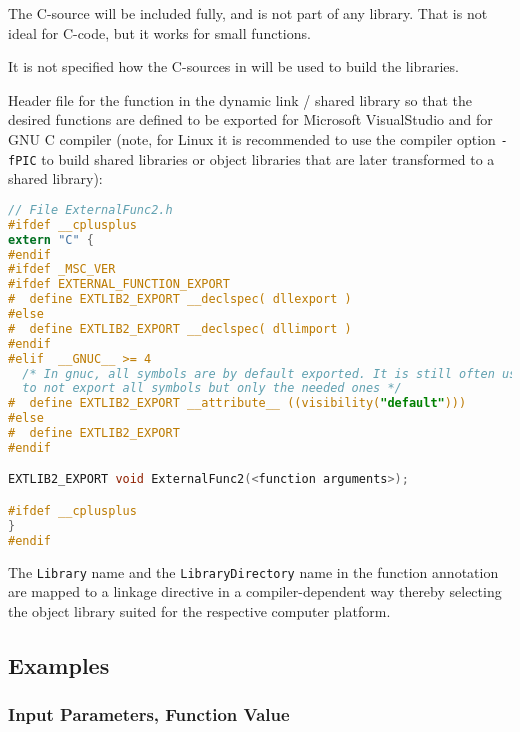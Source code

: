 \begin{example}
The C-source  will be included fully, and is not part of any library.
That is not ideal for C-code, but it works for small functions.

It is not specified how the C-sources in  will be used to build the libraries.

Header file for the function in the dynamic link / shared library
 so that the desired functions are defined to be exported
for Microsoft VisualStudio and for GNU C compiler (note, for Linux it is
recommended to use the compiler option \lstinline!-fPIC! to build shared
libraries or object libraries that are later transformed to a shared
library):
\begin{lstlisting}[language=C]
// File ExternalFunc2.h
#ifdef __cplusplus
extern "C" {
#endif
#ifdef _MSC_VER
#ifdef EXTERNAL_FUNCTION_EXPORT
#  define EXTLIB2_EXPORT __declspec( dllexport )
#else
#  define EXTLIB2_EXPORT __declspec( dllimport )
#endif
#elif  __GNUC__ >= 4
  /* In gnuc, all symbols are by default exported. It is still often useful,
  to not export all symbols but only the needed ones */
#  define EXTLIB2_EXPORT __attribute__ ((visibility("default")))
#else
#  define EXTLIB2_EXPORT
#endif

EXTLIB2_EXPORT void ExternalFunc2(<function arguments>);

#ifdef __cplusplus
}
#endif
\end{lstlisting}
\end{example}

The \lstinline!Library! name and the \lstinline!LibraryDirectory! name in the function annotation are mapped to a linkage directive in a compiler-dependent way thereby selecting the object library suited for the respective computer platform.

\subsection{Examples}\label{examples1}

\subsubsection{Input Parameters, Function Value}\label{input-parameters-function-value}

